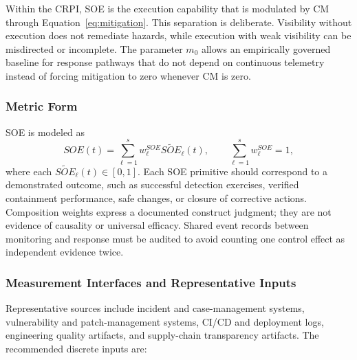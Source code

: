 \documentclass[11pt]{article}
\begin{document}
Within the CRPI, SOE is the execution capability that is modulated by CM through
Equation~\ref{eq:mitigation}. This separation is deliberate. Visibility without
execution does not remediate hazards, while execution with weak visibility can be
misdirected or incomplete. The parameter $m_0$ allows an empirically governed baseline
for response pathways that do not depend on continuous telemetry instead of forcing
mitigation to zero whenever CM is zero.

\subsubsection{Metric Form}
SOE is modeled as
\begin{equation}
  SOE(t)=\sum_{\ell=1}^{s}w_\ell^{SOE}\widetilde{SOE}_\ell(t),
  \qquad \sum_{\ell=1}^{s}w_\ell^{SOE}=1,
\end{equation}
where each $\widetilde{SOE}_\ell(t)\in[0,1]$.
Each SOE primitive should correspond to a demonstrated outcome,
such as successful detection exercises, verified containment
performance, safe changes, or closure of corrective actions.
Composition weights express a documented construct judgment; they
are not evidence of causality or universal efficacy. Shared event
records between monitoring and response must be audited to avoid
counting one control effect as independent evidence twice.

\subsubsection{Measurement Interfaces and Representative Inputs}
Representative sources include incident and case-management systems, vulnerability and
patch-management systems, CI/CD and deployment logs, engineering quality artifacts, and
supply-chain transparency artifacts. The recommended discrete inputs are:
\end{document}
